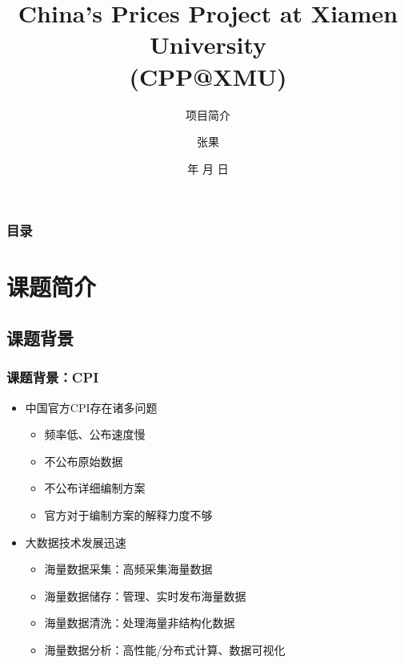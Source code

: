 \documentclass{beamer}
\begin{document}
\title{China's Prices Project at Xiamen University\\(CPP@XMU)}
\subtitle{项目简介}

\author{张果}


\renewcommand{\today}{\number\year 年 \number\month 月 \number\day 日}
\date{\today}

\subject{Presentations}

\begin{frame}
\titlepage
\end{frame}

\begin{frame}
\frametitle{目录}
\begin{multicols}{2}
\tableofcontents
\end{multicols}
\end{frame}

\section{课题简介}
\subsection{课题背景}
\begin{frame}
\frametitle{课题背景：CPI}
\begin{itemize}
  \item 中国官方CPI存在诸多问题
  \begin{itemize}
    \item 频率低、公布速度慢
    \item 不公布原始数据
    \item 不公布详细编制方案
    \item 官方对于编制方案的解释力度不够
  \end{itemize}
  \item 大数据技术发展迅速
  \begin{itemize}
    \item 海量数据采集：高频采集海量数据
    \item 海量数据储存：管理、实时发布海量数据
    \item 海量数据清洗：处理海量非结构化数据
    \item 海量数据分析：高性能/分布式计算、数据可视化
  \end{itemize}
\end{itemize}
\end{frame}
\end{document}

